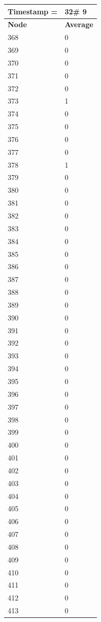 \begin{tabular}{|l||l|}
\hline
\textbf{Timestamp =} & \textbf{32}\# 9\\\hline
	\textbf{Node} & \textbf{Average} \\ \hline
\hline
	368 & 0 \\ \hline
	369 & 0 \\ \hline
	370 & 0 \\ \hline
	371 & 0 \\ \hline
	372 & 0 \\ \hline
	373 & 1 \\ \hline
	374 & 0 \\ \hline
	375 & 0 \\ \hline
	376 & 0 \\ \hline
	377 & 0 \\ \hline
	378 & 1 \\ \hline
	379 & 0 \\ \hline
	380 & 0 \\ \hline
	381 & 0 \\ \hline
	382 & 0 \\ \hline
	383 & 0 \\ \hline
	384 & 0 \\ \hline
	385 & 0 \\ \hline
	386 & 0 \\ \hline
	387 & 0 \\ \hline
	388 & 0 \\ \hline
	389 & 0 \\ \hline
	390 & 0 \\ \hline
	391 & 0 \\ \hline
	392 & 0 \\ \hline
	393 & 0 \\ \hline
	394 & 0 \\ \hline
	395 & 0 \\ \hline
	396 & 0 \\ \hline
	397 & 0 \\ \hline
	398 & 0 \\ \hline
	399 & 0 \\ \hline
	400 & 0 \\ \hline
	401 & 0 \\ \hline
	402 & 0 \\ \hline
	403 & 0 \\ \hline
	404 & 0 \\ \hline
	405 & 0 \\ \hline
	406 & 0 \\ \hline
	407 & 0 \\ \hline
	408 & 0 \\ \hline
	409 & 0 \\ \hline
	410 & 0 \\ \hline
	411 & 0 \\ \hline
	412 & 0 \\ \hline
	413 & 0 \\ \hline
\end{tabular}

